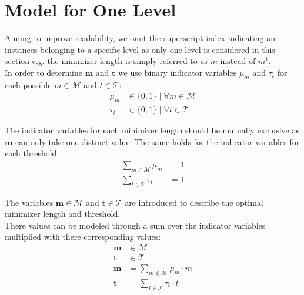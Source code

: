 \documentclass[a4paper,titlepage,onecolumn,oneside,12pt,nenglish,titlepage=firstiscover]{scrbook}
\theoremstyle{plain} %
\theoremstyle{definition} %
\theoremstyle{remark} %
\theoremstyle{plain}
\newcommand{\minimizerLength}{m}
\newcommand{\threshold}{t}
\newcommand{\possibleMinimizerLengths}{\mathcal{M}}
\newcommand{\possibleThresholds}{\mathcal{T}}
\newcommand{\indicatorm}{\mu}
\newcommand{\indicatort}{\tau}
\newcommand{\varMinimizerLength}{\textbf{\minimizerLength}}
\newcommand{\varThreshold}{\textbf{\threshold}}
\begin{document}
\section{Model for One Level}\label{sec:minlp_oneLevel}
Aiming to improve readability, we omit the superscript index indicating an instances belonging to a specific level as only one level is considered in this section e.g. the minimizer length is simply referred to as $\minimizerLength$ instead of $\minimizerLength^1$.
\\
In order to determine $\varMinimizerLength$ and $\varThreshold$ we use binary indicator variables $\indicatorm_\minimizerLength$ and $\indicatort_\threshold$ for each possible $\minimizerLength \in \possibleMinimizerLengths$ and $\threshold \in \possibleThresholds$:
\begin{align}
	\indicatorm_\minimizerLength &\in \{0,1\} \mid \forall \minimizerLength \in \possibleMinimizerLengths \label{variable:indicatorsM}\\
	\indicatort_\threshold &\in \{0,1\} \mid \forall \threshold \in \possibleThresholds \label{variable:indicatorsT}
\end{align} 

The indicator variables for each minimizer length should be mutually exclusive as $\varMinimizerLength$ can only take one distinct value. The same holds for the indicator variables for each threshold:
\newcommand{\mututallyExclusiveM}{\sum\limits_{\minimizerLength \in \possibleMinimizerLengths} \indicatorm_\minimizerLength &= 1}
\newcommand{\mututallyExclusiveT}{\sum\limits_{\threshold \in \possibleThresholds} \indicatort_\threshold &= 1}
\begin{align}
	\mututallyExclusiveM \label{constraint:mututallyExclusiveM}\\
	\mututallyExclusiveT \label{constraint:mututallyExclusiveT}
\end{align}

The variables $\varMinimizerLength \in \possibleMinimizerLengths$ and $\varThreshold \in \possibleThresholds$ are introduced to describe the optimal minimizer length and threshold.\\
There values can be modeled through a sum over the indicator variables multiplied with there corresponding values:
\newcommand{\optimalM}{\varMinimizerLength &= \sum\limits_{\minimizerLength \in \possibleMinimizerLengths} \indicatorm_\minimizerLength \cdot \minimizerLength}
\newcommand{\optimalT}{\varThreshold &= \sum\limits_{\threshold \in \possibleThresholds} \indicatort_\threshold \cdot \threshold}
\begin{align}
	\varMinimizerLength &\in \possibleMinimizerLengths \label{variable:optimalM}\\
	\varThreshold &\in \possibleThresholds \label{variable:optimalT}\\
	\optimalM \label{constraint:optimalM}\\
	\optimalT \label{constraint:optimalT}
\end{align}
\end{document}
